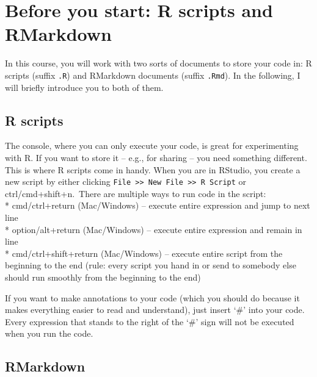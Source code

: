 \documentclass[
]{book}
\begin{document}
\hypertarget{before-you-start-r-scripts-and-rmarkdown}{%
\chapter{Before you start: R scripts and RMarkdown}\label{before-you-start-r-scripts-and-rmarkdown}}

In this course, you will work with two sorts of documents to store your code in: R scripts (suffix \texttt{.R}) and RMarkdown documents (suffix \texttt{.Rmd}). In the following, I will briefly introduce you to both of them.

\hypertarget{r-scripts}{%
\section{R scripts}\label{r-scripts}}

The console, where you can only execute your code, is great for experimenting with R. If you want to store it -- e.g., for sharing -- you need something different. This is where R scripts come in handy. When you are in RStudio, you create a new script by either clicking \texttt{File\ \textgreater{}\textgreater{}\ New\ File\ \textgreater{}\textgreater{}\ R\ Script} or ctrl/cmd+shift+n.~There are multiple ways to run code in the script:\\
* cmd/ctrl+return (Mac/Windows) -- execute entire expression and jump to next line\\
* option/alt+return (Mac/Windows) -- execute entire expression and remain in line\\
* cmd/ctrl+shift+return (Mac/Windows) -- execute entire script from the beginning to the end (rule: every script you hand in or send to somebody else should run smoothly from the beginning to the end)

If you want to make annotations to your code (which you should do because it makes everything easier to read and understand), just insert `\#' into your code. Every expression that stands to the right of the `\#' sign will not be executed when you run the code.

\hypertarget{rmarkdown}{%
\section{RMarkdown}\label{rmarkdown}}
\end{document}
